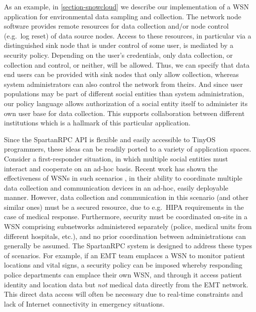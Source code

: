 As an example, in \autoref{section-snowcloud} we describe our
implementation of a WSN application for environmental data sampling
and collection.  The network node software provides remote resources
for data collection and/or node control (e.g.~log reset) of data source
nodes. Access to these resources, in particular via a distinguished sink
node that is under control of some user, is mediated by a security
policy. Depending on the user's credentials, only data collection, or
collection and control, or neither, will be allowed. Thus, we can
specify that data end users can be provided with sink nodes that only
allow collection, whereas system administrators can also control the
network from theirs. And since user populations may be part of
different social entities than system administration, our policy
language allows authorization of a social entity itself to administer
its own user base for data collection. This supports collaboration 
between different institutions which is a hallmark of this particular
application.

Since the SpartanRPC API is flexible and easily accessible to TinyOS
programmers, these ideas can be readily ported to a variety of
application spaces.  Consider a first-responder situation, in which
multiple social entities must interact and cooperate on an ad-hoc
basis. Recent work has shown the effectiveness of WSNs in such
scenarios \cite{citeulike:4460555,1038146}, in their ability to
coordinate multiple data collection and communication devices in an
ad-hoc, easily deployable manner. However, data collection and
communication in this scenario (and other similar ones) must be a
secured resource, due to e.g.~HIPA requirements in the case of medical
response. Furthermore, security must be coordinated on-site in a WSN
comprising subnetworks administered separately (police, medical units
from different hospitals, etc.), and no prior coordination between
administrations can generally be assumed. The SpartanRPC system is
designed to address these types of scenarios.
%
For example, if an EMT team emplaces a WSN to
monitor patient locations and vital signs, a security policy can be
imposed whereby responding police departments can emplace their own
WSN, and through it access patient identity and location data but
\emph{not} medical data directly from the EMT network. This direct
data access will often be necessary due to real-time constraints and
lack of Internet connectivity in emergency situations.

